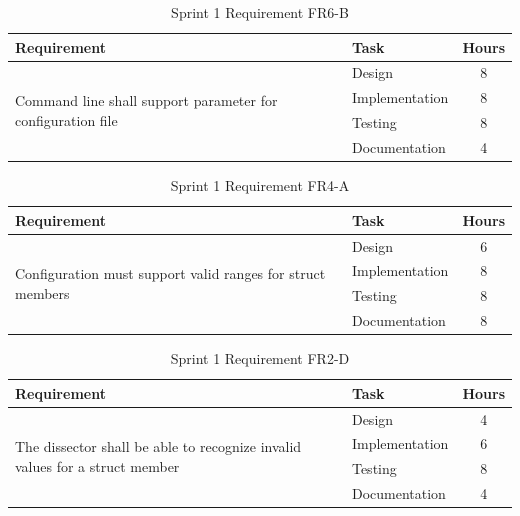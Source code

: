 \begin{table}[!ht] \small \center
\caption{Sprint 1 Requirement FR6-B\label{tab:sp1_req7b}}
\begin{tabular}{l l c}
	\toprule
	Requirement & Task & Hours \\
	\midrule
	\multirow{4}{5cm}{Command line shall support parameter for configuration file} & Design & 8 \\
	& Implementation & 8 \\
	& Testing & 8 \\
	& Documentation & 4 \\
	\bottomrule
\end{tabular}
\end{table}

\begin{table}[!ht] \small \center
\caption{Sprint 1 Requirement FR4-A\label{tab:sp1_req4a}}
\begin{tabular}{l l c}
	\toprule
	Requirement & Task & Hours \\
	\midrule
	\multirow{4}{5cm}{Configuration must support valid ranges for struct members} & Design & 6 \\
	& Implementation & 8 \\
	& Testing & 8 \\
	& Documentation & 8 \\
	\bottomrule
\end{tabular}
\end{table}

\begin{table}[!ht] \small \center
\caption{Sprint 1 Requirement FR2-D\label{tab:sp1_req2d}}
\begin{tabular}{l l c}
	\toprule
	Requirement & Task & Hours \\
	\midrule
	\multirow{4}{5cm}{The dissector shall be able to recognize invalid values for a struct member} & Design & 4 \\
	& Implementation & 6 \\
	& Testing & 8 \\
	& Documentation & 4 \\
	\bottomrule
\end{tabular}
\end{table}

